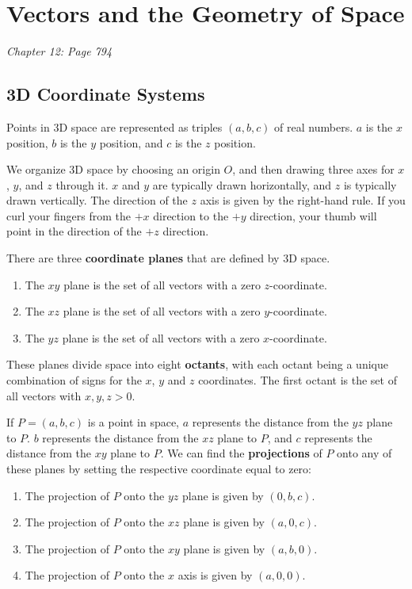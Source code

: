 \section{Vectors and the Geometry of Space}
\textit{Chapter 12: Page 794}
\subsection{3D Coordinate Systems}
Points in 3D space are represented as triples \((a,b,c)\) of real numbers. \(a\) is the \(x\) position, \(b\) is the \(y\) position, and \(c\) is the \(z\) position. 
\par
We organize 3D space by choosing an origin \(O\), and then drawing three axes for \(x\), \(y\), and \(z\) through it. \(x\) and \(y\) are typically drawn horizontally, and \(z\) is typically drawn vertically. The direction of the \(z\) axis is given by the right-hand rule. If you curl your fingers from the \(+x\) direction to the \(+y\) direction, your thumb will point in the direction of the \(+z\) direction. \par
There are three \textbf{coordinate planes} that are defined by 3D space. 
\begin{enumerate}
    \item The \(xy\) plane is the set of all vectors with a zero \(z\)-coordinate.
    \item The \(xz\) plane is the set of all vectors with a zero \(y\)-coordinate.
    \item The \(yz\) plane is the set of all vectors with a zero \(x\)-coordinate.
\end{enumerate}
These planes divide space into eight \textbf{octants}, with each octant being a unique combination of signs for the \(x\), \(y\) and \(z\) coordinates. The first octant is the set of all vectors with \(x,y,z>0\). \par
If \(P=(a,b,c)\) is a point in space, \(a\) represents the distance from the \(yz\) plane to \(P\). \(b\) represents the distance from the \(xz\) plane to \(P\), and \(c\) represents the distance from the \(xy\) plane to \(P\). We can find the \textbf{projections} of \(P\) onto any of these planes by setting the respective coordinate equal to zero:
\begin{enumerate}
    \item The projection of \(P\) onto the \(yz\) plane is given by \((0,b,c)\).
    \item The projection of \(P\) onto the \(xz\) plane is given by \((a,0,c)\).
    \item The projection of \(P\) onto the \(xy\) plane is given by \((a,b,0)\).
    \item The projection of \(P\) onto the \(x\) axis is given by \((a,0,0)\).
\end{enumerate}
